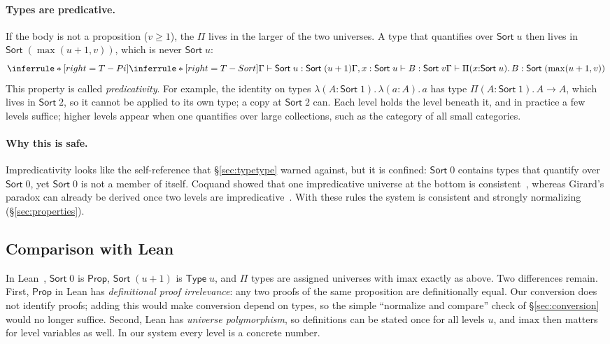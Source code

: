 \documentclass[acmsmall,screen,nonacm]{acmart}
\newcommand{\Sort}[1]{\mathsf{Sort}\;#1}
\newcommand{\tPi}[3]{\Pi(#1{:}#2).\,#3}
\newcommand{\tLam}[3]{\lambda(#1{:}#2).\,#3}
\newcommand{\imax}{\mathrm{imax}}
\begin{document}
\paragraph{Types are predicative.}
If the body is not a proposition ($v \ge 1$), the $\Pi$ lives in the larger of the two universes.
A type that quantifies over $\Sort{u}$ then lives in $\Sort{(\max(u+1, v))}$, which is never $\Sort{u}$:
\[
\inferrule*[right=T-Pi]
  {\inferrule*[right=T-Sort]{ }{\Gamma \vdash \Sort{u} : \Sort{(u+1)}} \\ \Gamma, x : \Sort{u} \vdash B : \Sort{v}}
  {\Gamma \vdash \tPi{x}{\Sort{u}}{B} : \Sort{(\max(u+1, v))}}
\]
This property is called \emph{predicativity}.
For example, the identity on types $\tLam{A}{\Sort{1}}{\tLam{a}{A}{a}}$ has type $\tPi{A}{\Sort{1}}{A \to A}$, which lives in $\Sort{2}$,
so it cannot be applied to its own type; a copy at $\Sort{2}$ can.
Each level holds the level beneath it, and in practice a few levels suffice; higher levels appear when one quantifies over large collections, such as the category of all small categories.

\paragraph{Why this is safe.}
Impredicativity looks like the self-reference that \S\ref{sec:typetype} warned against, but it is confined:
$\Sort{0}$ contains types that quantify over $\Sort{0}$, yet $\Sort{0}$ is not a member of itself.
Coquand showed that one impredicative universe at the bottom is consistent~\cite{coquand1988calculus},
whereas Girard's paradox can already be derived once two levels are impredicative~\cite{hurkens1995simplification}.
With these rules the system is consistent and strongly normalizing (\S\ref{sec:properties}).

\subsection{Comparison with Lean}

In Lean~\cite{moura2021lean4}, $\Sort{0}$ is $\mathsf{Prop}$, $\Sort{(u+1)}$ is $\mathsf{Type}\;u$, and $\Pi$ types are assigned universes with $\imax$ exactly as above.
Two differences remain.
First, $\mathsf{Prop}$ in Lean has \emph{definitional proof irrelevance}: any two proofs of the same proposition are definitionally equal.
Our conversion does not identify proofs; adding this would make conversion depend on types, so the simple ``normalize and compare'' check of \S\ref{sec:conversion} would no longer suffice.
Second, Lean has \emph{universe polymorphism}, so definitions can be stated once for all levels $u$, and $\imax$ then matters for level variables as well.
In our system every level is a concrete number.
\end{document}

